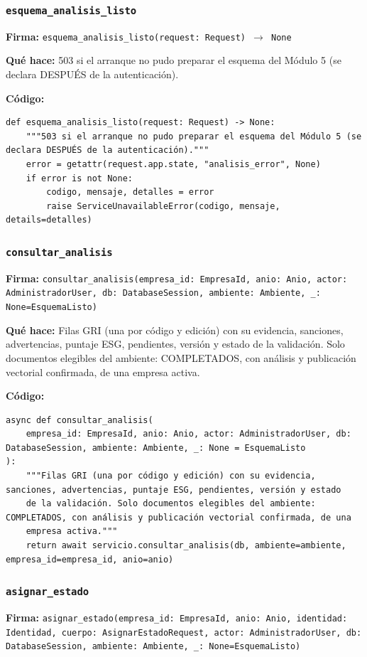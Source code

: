 \documentclass[11pt,a4paper]{article}
\begin{document}
\subsubsection*{\texttt{esquema\_analisis\_listo}}
\textbf{Firma:} \texttt{esquema\_analisis\_listo(request: Request) $\rightarrow$ None}

\textbf{Qué hace:} 503 si el arranque no pudo preparar el esquema del Módulo 5 (se declara DESPUÉS de la autenticación).

\textbf{Código:}
\begin{lstlisting}
def esquema_analisis_listo(request: Request) -> None:
    """503 si el arranque no pudo preparar el esquema del Módulo 5 (se declara DESPUÉS de la autenticación)."""
    error = getattr(request.app.state, "analisis_error", None)
    if error is not None:
        codigo, mensaje, detalles = error
        raise ServiceUnavailableError(codigo, mensaje, details=detalles)
\end{lstlisting}

\subsubsection*{\texttt{consultar\_analisis}}
\textbf{Firma:} \texttt{consultar\_analisis(empresa\_id: EmpresaId, anio: Anio, actor: AdministradorUser, db: DatabaseSession, ambiente: Ambiente, \_: None=EsquemaListo)}

\textbf{Qué hace:} Filas GRI (una por código y edición) con su evidencia, sanciones, advertencias, puntaje ESG, pendientes, versión y estado
de la validación. Solo documentos elegibles del ambiente: COMPLETADOS, con análisis y publicación vectorial confirmada, de una
empresa activa.

\textbf{Código:}
\begin{lstlisting}
async def consultar_analisis(
    empresa_id: EmpresaId, anio: Anio, actor: AdministradorUser, db: DatabaseSession, ambiente: Ambiente, _: None = EsquemaListo
):
    """Filas GRI (una por código y edición) con su evidencia, sanciones, advertencias, puntaje ESG, pendientes, versión y estado
    de la validación. Solo documentos elegibles del ambiente: COMPLETADOS, con análisis y publicación vectorial confirmada, de una
    empresa activa."""
    return await servicio.consultar_analisis(db, ambiente=ambiente, empresa_id=empresa_id, anio=anio)
\end{lstlisting}

\subsubsection*{\texttt{asignar\_estado}}
\textbf{Firma:} \texttt{asignar\_estado(empresa\_id: EmpresaId, anio: Anio, identidad: Identidad, cuerpo: AsignarEstadoRequest, actor: AdministradorUser, db: DatabaseSession, ambiente: Ambiente, \_: None=EsquemaListo)}
\end{document}
